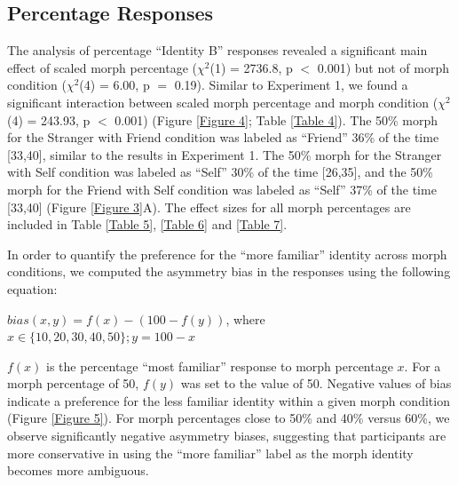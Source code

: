 \documentclass[10pt,letterpaper]{article}
\begin{document}
\subsection*{Percentage Responses}
The analysis of percentage “Identity B” responses revealed a significant main effect of scaled morph percentage (\( \chi^2 \)(1) = 2736.8, p $<$ 0.001) but not of morph condition (\( \chi^2 \)(4) = 6.00, p $=$ 0.19). Similar to Experiment 1, we found a significant interaction between scaled morph percentage and morph condition (\( \chi^2 \)(4) = 243.93, p $<$ 0.001) (Figure \ref{Figure 4}; Table \ref{Table 4}). The 50\% morph for the Stranger with Friend condition was labeled as “Friend” 36\% of the time [33,40], similar to the results in Experiment 1. The 50\% morph for the Stranger with Self condition was labeled as “Self” 30\% of the time [26,35], and the 50\% morph for the Friend with Self condition was labeled as “Self” 37\% of the time [33,40] (Figure \ref{Figure 3}A). The effect sizes for all morph percentages are included in Table \ref{Table 5}, \ref{Table 6} and \ref{Table 7}. 

In order to quantify the preference for the “more familiar” identity across morph conditions, we computed the asymmetry bias in the responses using the following equation: 
\begin{center}
$bias(x, y) = f(x) - (100-f(y))$, where $x \in \{10, 20, 30, 40, 50\}; y = 100-x $
\end{center}
$f(x)$ is the percentage “most familiar” response to morph percentage $x$. For a morph percentage of 50, $f(y)$ was set to the value of 50.  Negative values of bias indicate a preference for the less familiar identity within a given morph condition (Figure \ref{Figure 5}). For morph percentages close to 50\% and 40\% versus 60\%, we observe significantly negative asymmetry biases, suggesting that participants are more conservative in using the “more familiar” label as the morph identity becomes more ambiguous. 
\end{document}
